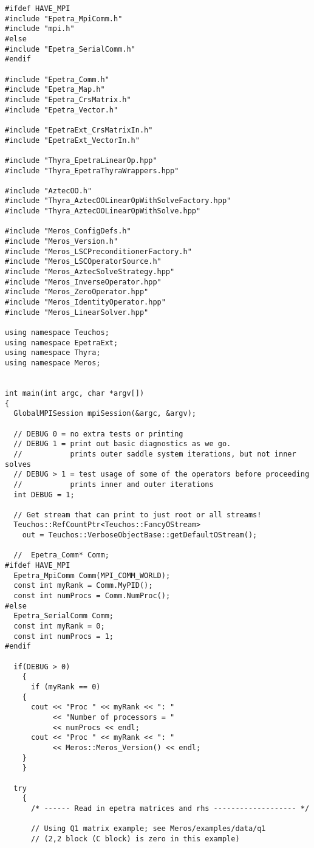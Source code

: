 \begin{verbatim}
#ifdef HAVE_MPI
#include "Epetra_MpiComm.h"
#include "mpi.h"
#else
#include "Epetra_SerialComm.h"
#endif

#include "Epetra_Comm.h"
#include "Epetra_Map.h"
#include "Epetra_CrsMatrix.h"
#include "Epetra_Vector.h"

#include "EpetraExt_CrsMatrixIn.h"
#include "EpetraExt_VectorIn.h"

#include "Thyra_EpetraLinearOp.hpp"
#include "Thyra_EpetraThyraWrappers.hpp"

#include "AztecOO.h"
#include "Thyra_AztecOOLinearOpWithSolveFactory.hpp"
#include "Thyra_AztecOOLinearOpWithSolve.hpp"

#include "Meros_ConfigDefs.h"
#include "Meros_Version.h"
#include "Meros_LSCPreconditionerFactory.h"
#include "Meros_LSCOperatorSource.h"
#include "Meros_AztecSolveStrategy.hpp"
#include "Meros_InverseOperator.hpp"
#include "Meros_ZeroOperator.hpp"
#include "Meros_IdentityOperator.hpp"
#include "Meros_LinearSolver.hpp"

using namespace Teuchos;
using namespace EpetraExt;
using namespace Thyra;
using namespace Meros;


int main(int argc, char *argv[]) 
{
  GlobalMPISession mpiSession(&argc, &argv);

  // DEBUG 0 = no extra tests or printing
  // DEBUG 1 = print out basic diagnostics as we go.
  //           prints outer saddle system iterations, but not inner solves
  // DEBUG > 1 = test usage of some of the operators before proceeding
  //           prints inner and outer iterations
  int DEBUG = 1;

  // Get stream that can print to just root or all streams!
  Teuchos::RefCountPtr<Teuchos::FancyOStream>
    out = Teuchos::VerboseObjectBase::getDefaultOStream();

  //  Epetra_Comm* Comm;
#ifdef HAVE_MPI
  Epetra_MpiComm Comm(MPI_COMM_WORLD);
  const int myRank = Comm.MyPID();
  const int numProcs = Comm.NumProc();
#else
  Epetra_SerialComm Comm;
  const int myRank = 0;
  const int numProcs = 1;
#endif

  if(DEBUG > 0)
    {
      if (myRank == 0)
	{
	  cout << "Proc " << myRank << ": " 
	       << "Number of processors = " 
	       << numProcs << endl;
	  cout << "Proc " << myRank << ": " 
	       << Meros::Meros_Version() << endl;
	}
    }
  
  try
    {
      /* ------ Read in epetra matrices and rhs ------------------- */

      // Using Q1 matrix example; see Meros/examples/data/q1
      // (2,2 block (C block) is zero in this example)
  

\end{verbatim}
